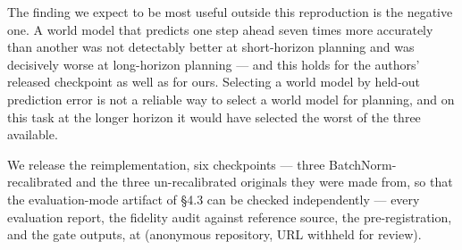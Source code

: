 \documentclass[10pt]{article}
\begin{document}
The finding we expect to be most useful outside this reproduction is the
negative one. A world model that predicts one step ahead seven times more
accurately than another was not detectably better at short-horizon planning and
was decisively worse at long-horizon planning --- and this holds for the authors'
released checkpoint as well as for ours. Selecting a world model by held-out
prediction error is not a reliable way to select a world model for planning, and
on this task at the longer horizon it would have selected the worst of the three
available.

We release the reimplementation, six checkpoints --- three BatchNorm-recalibrated and the three un-recalibrated originals they were made from, so that the evaluation-mode artifact of \S{}4.3 can be checked independently --- every evaluation report,
the fidelity audit against reference source, the pre-registration, and the gate
outputs, at (anonymous repository, URL withheld for review).

\nocite{*}


\end{document}
